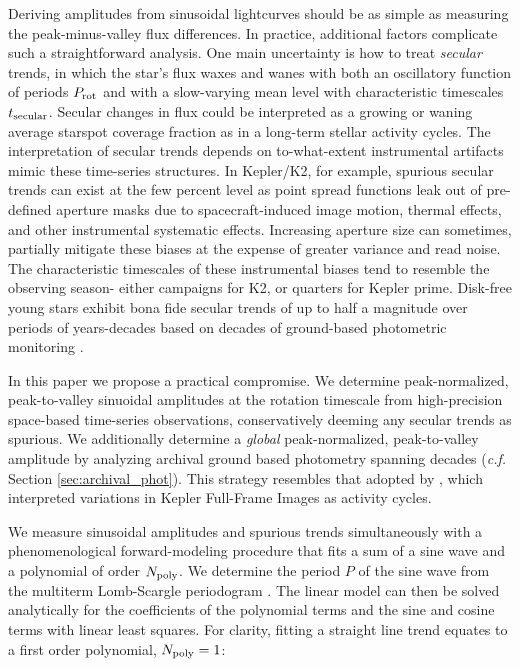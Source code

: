 \documentclass[twocolumn]{emulateapj}%
\begin{document}
Deriving amplitudes from sinusoidal lightcurves should be as simple as measuring the peak-minus-valley flux differences.  In practice, additional factors complicate such a straightforward analysis.  One main uncertainty is how to treat \emph{secular} trends, in which the star's flux waxes and wanes with both an oscillatory function of periods $P_{\rm rot}$ and with a slow-varying mean level with characteristic timescales $t_{\rm secular}$.  Secular changes in flux could be interpreted as a growing or waning average starspot coverage fraction as in a long-term stellar activity cycles.  The interpretation of secular trends depends on to-what-extent instrumental artifacts mimic these time-series structures.  In Kepler/K2, for example, spurious secular trends can exist at the few percent level as point spread functions leak out of pre-defined aperture masks due to spacecraft-induced image motion, thermal effects, and other instrumental systematic effects.  Increasing aperture size can sometimes, partially mitigate these biases at the expense of greater variance and read noise.  The characteristic timescales of these instrumental biases tend to resemble the observing season- either campaigns for K2, or quarters for Kepler prime.  Disk-free young stars exhibit bona fide secular trends of up to half a magnitude over periods of years-decades based on decades of ground-based photometric monitoring \citep{grankin08}.

In this paper we propose a practical compromise. We determine peak-normalized, peak-to-valley sinuoidal amplitudes at the rotation timescale from high-precision space-based time-series observations, conservatively deeming any secular trends as spurious.  We additionally determine a \emph{global} peak-normalized, peak-to-valley amplitude by analyzing archival ground based photometry spanning decades (\emph{c.f.} Section \ref{sec:archival_phot}).  This strategy resembles that adopted by \citet{2017ApJ...851..116M}, which interpreted variations in Kepler Full-Frame Images as activity cycles.

We measure sinusoidal amplitudes and spurious trends simultaneously with a phenomenological forward-modeling procedure that fits a sum of a sine wave and a polynomial of order $N_{\rm poly}$.  We determine the period $P$ of the sine wave from the multiterm Lomb-Scargle periodogram \citep{ivezic14}.  The linear model can then be solved analytically for the coefficients of the polynomial terms and the sine and cosine terms with linear least squares.  For clarity, fitting a straight line trend equates to a first order polynomial, $N_{\rm poly}=1$:
\end{document}
